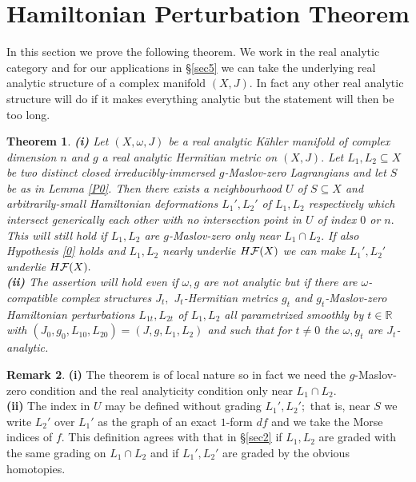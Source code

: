 \documentclass{article}
\theoremstyle{plain}%
\newtheorem{thm}{Theorem}[section]
\theoremstyle{definition}
\newtheorem{rem}[thm]{Remark}
\numberwithin{equation}{section}
\numberwithin{figure}{section}
\def\l{\label}
\def\cF{{\mathbin{\cal F}}}
\def\R{{\mathbin{\mathbb R}}}
\def\om{\omega}
\def\sb{\subseteq}
\begin{document}
\section{Hamiltonian Perturbation Theorem}\l{sec4}
In this section we prove the following theorem.
We work in the real analytic category
and for our applications in \S\ref{sec5} we can take the underlying real analytic structure of a complex manifold $(X,J).$
In fact any other real analytic structure will do if it makes everything analytic
but the statement will then be too long.
\begin{thm}\l{Ham}
{\bf(i)}
Let $(X,\om,J)$ be a real analytic K\"ahler manifold of complex dimension $n$
and $g$ a real analytic Hermitian metric on $(X,J).$
Let $L_1,L_2\sb X$ be two distinct closed irreducibly-immersed $g$-Maslov-zero Lagrangians
and let $S$ be as in Lemma \ref{P0}.
Then there exists a neighbourhood $U$ of $S\sb X$
and arbitrarily-small Hamiltonian deformations $L_1',L_2'$ of $L_1,L_2$ respectively
which intersect generically each other with no intersection point in $U$ of index $0$ or $n.$
This will still hold if $L_1,L_2$ are $g$-Maslov-zero only near $L_1\cap L_2.$
If also Hypothesis \ref{0} holds and $L_1,L_2$ nearly underlie $H\cF(X)$ we can make $L_1',L_2'$ underlie $H\cF(X).$
\\{\bf(ii)}
The assertion will hold even if $\om,g$ are not analytic but if there are
$\om$-compatible complex structures $J_t,$
$J_t$-Hermitian metrics $g_t$ and $g_t$-Maslov-zero Hamiltonian perturbations $L_{1t},L_{2t}$ of $L_1,L_2$
all parametrized smoothly by $t\in\R$ with $(J_0,g_0,L_{10},L_{20})=(J,g,L_1,L_2)$
and such that for $t\ne0$ the $\om,g_t$ are $J_t$-analytic.
\end{thm}
\begin{rem}
{\bf(i)}
The theorem is of local nature so in fact we need the $g$-Maslov-zero condition and the real analyticity condition only near $L_1\cap L_2.$
\\{\bf(ii)}
The index in $U$ may be defined without grading $L_1',L_2';$ that is, near $S$ we write $L_2'$
over $L_1'$ as the graph of an exact $1$-form $df$ and we take the Morse indices of $f.$
This definition agrees with that in \S\ref{sec2}
if $L_1,L_2$ are graded with the same grading on $L_1\cap L_2$ and if $L_1',L_2'$ are graded by the obvious homotopies.
%
\end{rem}
\end{document}

